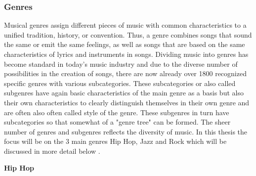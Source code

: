 \subsubsection{Genres}

Musical genres assign different pieces of music with common characteristics to a unified tradition,
history, or convention.
Thus, a genre combines songs that sound the same or emit the same feelings,
as well as songs that are based on the same characteristics of lyrics and instruments in songs.
Dividing music into genres has become standard in today's music industry and due to the diverse
number of possibilities in the creation of songs, there are now already over 1800 recognized specific
genres with various subcategories.
These subcategories or also called subgenres have again basic characteristics of the main
genre as a basis but also their own characteristics to clearly distinguish themselves in their own
genre and are often also often called style of the genre.
These subgenres in turn have subcategories so that somewhat of a "genre tree" can be formed.
The sheer number of genres and subgenres reflects the diversity of music.
In this thesis the focus will be on the 3 main genres Hip Hop, Jazz and Rock which will be discussed
in more detail below \cite{MusicflxRichtungen}.

\textbf{Hip Hop}

